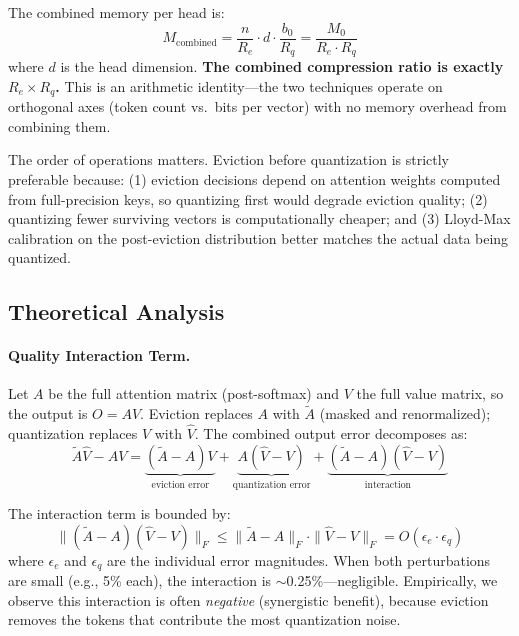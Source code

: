 \documentclass[11pt]{article}
\begin{document}
The combined memory per head is:
\begin{equation}
    M_{\text{combined}} = \frac{n}{R_e} \cdot d \cdot \frac{b_0}{R_q} = \frac{M_0}{R_e \cdot R_q}
    \label{eq:combined_memory}
\end{equation}
where $d$ is the head dimension.  \textbf{The combined compression ratio is exactly $R_e \times R_q$.}  This is an arithmetic identity---the two techniques operate on orthogonal axes (token count vs.\ bits per vector) with no memory overhead from combining them.

The order of operations matters.  Eviction before quantization is strictly preferable because: (1) eviction decisions depend on attention weights computed from full-precision keys, so quantizing first would degrade eviction quality; (2) quantizing fewer surviving vectors is computationally cheaper; and (3) Lloyd-Max calibration on the post-eviction distribution better matches the actual data being quantized.

\subsection{Theoretical Analysis}
\label{sec:theory}

\paragraph{Quality Interaction Term.}
Let $A$ be the full attention matrix (post-softmax) and $V$ the full value matrix, so the output is $O = AV$.  Eviction replaces $A$ with $\tilde{A}$ (masked and renormalized); quantization replaces $V$ with $\hat{V}$.  The combined output error decomposes as:
\begin{equation}
    \tilde{A}\hat{V} - AV = \underbrace{(\tilde{A} - A)V}_{\text{eviction error}} + \underbrace{A(\hat{V} - V)}_{\text{quantization error}} + \underbrace{(\tilde{A} - A)(\hat{V} - V)}_{\text{interaction}}
    \label{eq:error_decomp}
\end{equation}

The interaction term is bounded by:
\begin{equation}
    \|(\tilde{A} - A)(\hat{V} - V)\|_F \leq \|\tilde{A} - A\|_F \cdot \|\hat{V} - V\|_F = O(\epsilon_e \cdot \epsilon_q)
    \label{eq:interaction_bound}
\end{equation}
where $\epsilon_e$ and $\epsilon_q$ are the individual error magnitudes.  When both perturbations are small (e.g., 5\% each), the interaction is $\sim$0.25\%---negligible.  Empirically, we observe this interaction is often \emph{negative} (synergistic benefit), because eviction removes the tokens that contribute the most quantization noise.
\end{document}

